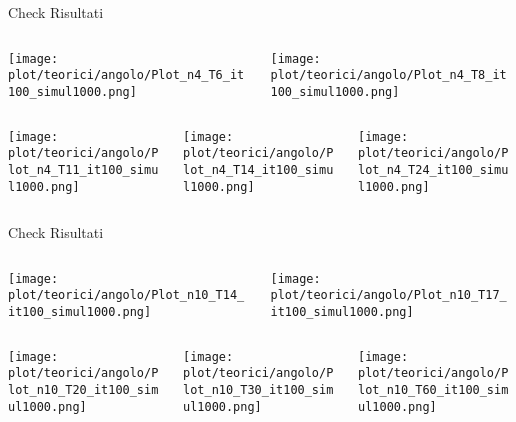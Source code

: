 \documentclass{beamer}
\newcommand{\1}{\mathbbm{1}}
\begin{document}
\begin{frame}{Check Risultati}
\begin{columns}
\begin{column}{0.5\linewidth}
\texttt{[image: plot/teorici/angolo/Plot\_n4\_T6\_it100\_simul1000.png]}
\end{column}
\begin{column}{0.5\linewidth}
\texttt{[image: plot/teorici/angolo/Plot\_n4\_T8\_it100\_simul1000.png]}
\end{column}
\end{columns}
\begin{columns}
\begin{column}{0.33\linewidth}
\texttt{[image: plot/teorici/angolo/Plot\_n4\_T11\_it100\_simul1000.png]}
\end{column}
\begin{column}{0.33\linewidth}
\texttt{[image: plot/teorici/angolo/Plot\_n4\_T14\_it100\_simul1000.png]}
\end{column}
\begin{column}{0.33\linewidth}
\texttt{[image: plot/teorici/angolo/Plot\_n4\_T24\_it100\_simul1000.png]}
\end{column}
\end{columns}
\end{frame}

\begin{frame}{Check Risultati}
\begin{columns}
\begin{column}{0.5\linewidth}
\texttt{[image: plot/teorici/angolo/Plot\_n10\_T14\_it100\_simul1000.png]}
\end{column}
\begin{column}{0.5\linewidth}
\texttt{[image: plot/teorici/angolo/Plot\_n10\_T17\_it100\_simul1000.png]}
\end{column}
\end{columns}
\begin{columns}
\begin{column}{0.33\linewidth}
\texttt{[image: plot/teorici/angolo/Plot\_n10\_T20\_it100\_simul1000.png]}
\end{column}
\begin{column}{0.33\linewidth}
\texttt{[image: plot/teorici/angolo/Plot\_n10\_T30\_it100\_simul1000.png]}
\end{column}
\begin{column}{0.33\linewidth}
\texttt{[image: plot/teorici/angolo/Plot\_n10\_T60\_it100\_simul1000.png]}
\end{column}
\end{columns}
\end{frame}
\end{document}
